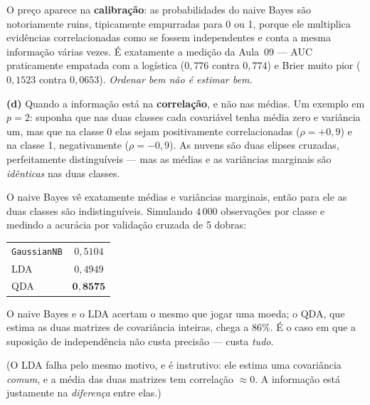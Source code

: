 \documentclass[11pt,a4paper]{article}
\begin{document}
\begin{solucao}
O preço aparece na \textbf{calibração}: as probabilidades do naive Bayes são
notoriamente ruins, tipicamente empurradas para 0 ou 1, porque ele multiplica
evidências correlacionadas como se fossem independentes e conta a mesma
informação várias vezes. É exatamente a medição da Aula~09 --- AUC praticamente
empatada com a logística ($0{,}776$ contra $0{,}774$) e Brier muito pior
($0{,}1523$ contra $0{,}0653$). \emph{Ordenar bem não é estimar bem.}

\smallskip
\textbf{(d)} Quando a informação está na \textbf{correlação}, e não nas médias.
Um exemplo em $p=2$: suponha que nas duas classes cada covariável tenha média
zero e variância um, mas que na classe 0 elas sejam positivamente correlacionadas
($\rho=+0{,}9$) e na classe 1, negativamente ($\rho=-0{,}9$). As nuvens são duas
elipses cruzadas, perfeitamente distinguíveis --- mas as médias e as variâncias
marginais são \emph{idênticas} nas duas classes.

O naive Bayes vê exatamente médias e variâncias marginais, então para ele as duas
classes são indistinguíveis. Simulando $4\,000$ observações por classe e medindo
a acurácia por validação cruzada de 5 dobras:
\begin{center}\small
\begin{tabular}{@{}lc@{}}
\toprule
\texttt{GaussianNB} & $0{,}5104$ \\
LDA                 & $0{,}4949$ \\
QDA                 & $\mathbf{0{,}8575}$ \\
\bottomrule
\end{tabular}
\end{center}
O naive Bayes e o LDA acertam o mesmo que jogar uma moeda; o QDA, que estima as
duas matrizes de covariância inteiras, chega a $86\%$. É o caso em que a
suposição de independência não custa precisão --- custa \emph{tudo}.

(O LDA falha pelo mesmo motivo, e é instrutivo: ele estima uma covariância
\emph{comum}, e a média das duas matrizes tem correlação $\approx 0$. A
informação está justamente na \emph{diferença} entre elas.)
\end{solucao}
\end{document}
